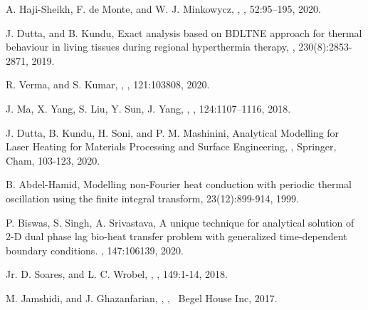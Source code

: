 \documentclass[sn-mathphys]{sn-jnl}%
\theoremstyle{thmstyleone}%
\theoremstyle{thmstyletwo}%
\theoremstyle{thmstylethree}%
\begin{document}
\begin{thebibliography}{9}
	A. Haji-Sheikh, F. de Monte, and W. J. Minkowycz, , , 52:95--195, 2020.
	
	J. Dutta, and B. Kundu, \newblock Exact analysis based on BDLTNE approach for thermal behaviour in living tissues during regional hyperthermia therapy, , 230(8):2853-2871, 2019.
	
	R. Verma, and S. Kumar, , , 121:103808, 2020.
	
	J. Ma, X. Yang, S. Liu, Y. Sun, J. Yang, , , 124:1107--1116, 2018.
	
	J. Dutta, B. Kundu, H. Soni, and P. M. Mashinini, \newblock Analytical Modelling for Laser Heating for Materials Processing and Surface Engineering, , Springer, Cham, 103-123, 2020.
	
	B. Abdel-Hamid, \newblock Modelling non-Fourier heat conduction with periodic thermal oscillation using the finite integral transform,  23(12):899-914, 1999.
	
	P. Biswas, S. Singh, A. Srivastava, \newblock A unique technique for analytical solution of 2-D dual phase lag bio-heat transfer problem with generalized time-dependent boundary conditions. , 147:106139, 2020.	
	
	Jr. D. Soares, and L. C. Wrobel, , , 149:1-14, 2018.
	
	M. Jamshidi, and J. Ghazanfarian, , ,  Begel House Inc, 2017.
	

\end{thebibliography}
\end{document}
